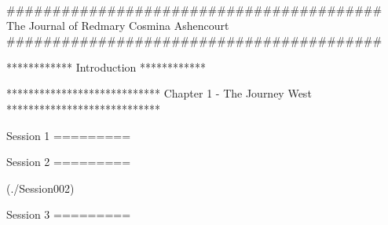 #########################################
The Journal of Redmary Cosmina Ashencourt
#########################################

	************
	Introduction
	************
	
		

	****************************
	Chapter 1 - The Journey West
	****************************
		
		Session 1
		=========
		
			

		Session 2
		=========
	
			(./Session002)
			
		Session 3
		=========

